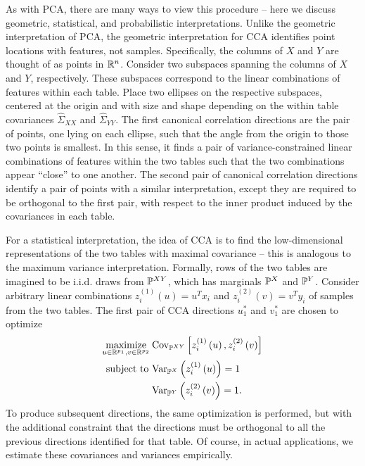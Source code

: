 \documentclass[utf8]{frontiersFPHY} %
\begin{document}
As with PCA, there are many ways to view this procedure -- here we discuss
geometric, statistical, and probabilistic interpretations. Unlike the geometric
interpretation of PCA, the geometric interpretation for CCA identifies point
locations with features, not samples. Specifically, the columns of $X$ and $Y$
are thought of as points in $\reals^{n}$. Consider two subspaces spanning the
columns of $X$ and $Y$, respectively. These subspaces correspond to the linear
combinations of features within each table. Place two ellipses on the respective
subspaces, centered at the origin and with size and shape depending on the
within table covariances $\hat{\Sigma}_{XX}$ and $\hat{\Sigma}_{YY}$. The first
canonical correlation directions are the pair of points, one lying on each
ellipse, such that the angle from the origin to those two points is smallest. In
this sense, it finds a pair of variance-constrained linear combinations of
features within the two tables such that the two combinations appear ``close''
to one another. The second pair of canonical correlation directions identify a
pair of points with a similar interpretation, except they are required to be
orthogonal to the first pair, with respect to the inner product induced by the
covariances in each table.

For a statistical interpretation, the idea of CCA is to find the low-dimensional
representations of the two tables with maximal covariance -- this is analogous
to the maximum variance interpretation. Formally, rows of the two tables are
imagined to be i.i.d. draws from $\P^{XY}$, which has marginals $\P^{X}$ and
$\P^{Y}$. Consider arbitrary linear combinations $z_{i}^{(1)}\left(u\right) =
u^{T} x_{i}$ and $z_{i}^{(2)}\left(v\right) = v^{T}y_{i}$ of samples from the
two tables. The first pair of CCA directions $u_{1}^{\ast}$ and $v_{1}^{\ast}$
are chosen to optimize
\begin{align}
  \maximize_{u \in \reals^{p_{1}}, v \in \reals^{p_{2}}}\medspace
  &\Covsubarg{\P^{XY}}{z_{i}^{(1)}\left(u\right),
    z_{i}^{(2)}\left(v\right)} \label{eq:cancor_optim} \\ \text{subject to }
  &\Varsubarg{\P^{X}}{z_{i}^{(1)}\left(u\right)} = 1 \nonumber
  \\ &\Varsubarg{\P^{Y}}{z_{i}^{(2)}\left(v\right)} = 1. \nonumber
\end{align}
To produce subsequent directions, the same optimization is performed, but with
the additional constraint that the directions must be orthogonal to all the
previous directions identified for that table. Of course, in actual
applications, we estimate these covariances and variances empirically.
\end{document}
